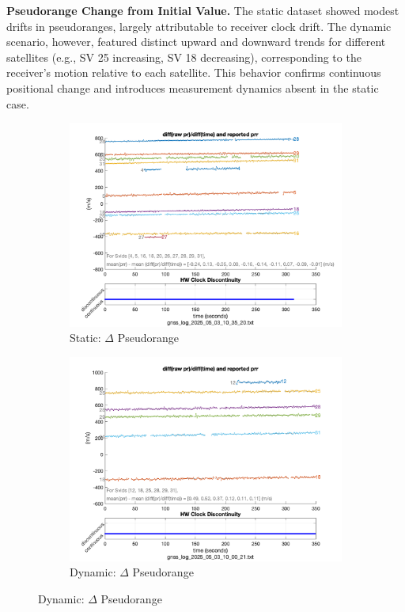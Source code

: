         \vspace{0.5em}
        \textbf{Pseudorange Change from Initial Value.} 
        The static dataset showed modest drifts in pseudoranges, largely attributable to receiver clock drift. 
        The dynamic scenario, however, featured distinct upward and downward trends for different satellites (e.g., SV 25 increasing, SV 18 decreasing), corresponding to the receiver's motion relative to each satellite. 
        This behavior confirms continuous positional change and introduces measurement dynamics absent in the static case.
    
        \begin{figure}[H]
            \centering
            \begin{subfigure}{0.23\textwidth}
                \includegraphics[width=\textwidth]{images/tests/Monte_Cappuccini/png/Samsung_A51_Monte_Cappuccini_fig2.png}
                \caption{Static: $\Delta$ Pseudorange}
            \end{subfigure}
            \hfill
            \begin{subfigure}{0.23\textwidth}
                \includegraphics[width=\textwidth]{images/tests/Tram_15_trip_Castello_to_Pescatore/png/Samsung_A51_Tram_15_trip_Castello_to_Pescatore_fig2.png}
                \caption{Dynamic: $\Delta$ Pseudorange}
            \end{subfigure}
        \end{figure}
    
